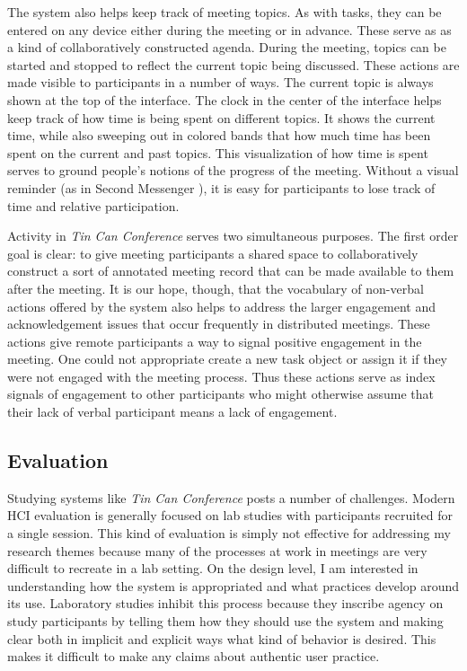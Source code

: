 \documentclass{tufte-handout}
\begin{document}
The system also helps keep track of meeting topics. As with tasks, they can be entered on any device either during the meeting or in advance. These serve as as a kind of collaboratively constructed agenda. During the meeting, topics can be started and stopped to reflect the current topic being discussed. These actions are made visible to participants in a number of ways. The current topic is always shown at the top of the interface. The clock in the center of the interface helps keep track of how time is being spent on different topics. It shows the current time, while also sweeping out in colored bands that how much time has been spent on the current and past topics. This visualization of how time is spent serves to ground people's notions of the progress of the meeting. Without a visual reminder (as in Second Messenger \citep{DiMicco:2007ie}), it is easy for participants to lose track of time and relative participation.

Activity in \emph{Tin Can Conference} serves two simultaneous purposes. The first order goal is clear: to give meeting participants a shared space to collaboratively construct a sort of annotated meeting record that can be made available to them after the meeting. It is our hope, though, that the vocabulary of non-verbal actions offered by the system also helps to address the larger engagement and acknowledgement issues that occur frequently in distributed meetings. These actions give remote participants a way to signal positive engagement in the meeting. One could not appropriate create a new task object or assign it if they were not engaged with the meeting process. Thus these actions serve as index signals of engagement to other participants who might otherwise assume that their lack of verbal participant means a lack of engagement.




\subsection{Evaluation}

Studying systems like \emph{Tin Can Conference} posts a number of challenges. Modern HCI evaluation is generally focused on lab studies with participants recruited for a single session. This kind of evaluation is simply not effective for addressing my research themes because many of the processes at work in meetings are very difficult to recreate in a lab setting. On the design level, I am interested in understanding how the system is appropriated and what practices develop around its use. Laboratory studies inhibit this process because they inscribe agency on study participants by telling them how they should use the system and making clear both in implicit and explicit ways what kind of behavior is desired. This makes it difficult to make any claims about authentic user practice.
\end{document}
